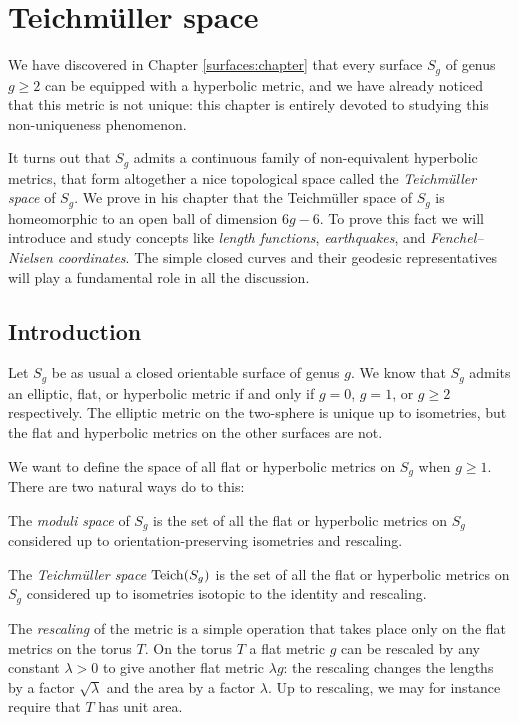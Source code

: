 \chapter{Teichm\"uller space} \label{Teichmuller:chapter}
We have discovered in Chapter \ref{surfaces:chapter} that every surface $S_g$ of genus $g\geqslant 2$ can be equipped with a hyperbolic metric, and we have already noticed that this metric is not unique: this chapter is entirely devoted to studying this non-uniqueness phenomenon.

It turns out that $S_g$ admits a continuous family of non-equivalent hyperbolic metrics, that form altogether a nice topological space called the \emph{Teichm\"uller space} of $S_g$. We prove in his chapter that the Teichm\"uller space of $S_g$ is homeomorphic to an open ball of dimension $6g-6$. To prove this fact we will introduce and study concepts like \emph{length functions}, \emph{earthquakes}, and \emph{Fenchel--Nielsen coordinates}. The simple closed curves and their geodesic representatives will play a fundamental role in all the discussion.

\section{Introduction}
Let $S_g$ be as usual a closed orientable surface of genus $g$. We know that $S_g$ admits an elliptic, flat, or hyperbolic metric if and only if $g=0$, $g=1$, or $g\geqslant 2$ respectively. The elliptic metric on the two-sphere is unique up to isometries, but the flat and hyperbolic metrics on the other surfaces are not.

We want to define the space of all flat or hyperbolic metrics on $S_g$ when $g\geqslant 1$. There are two natural ways do to this:

\begin{defn}
The \emph{moduli space} of $S_{g}$ is the set of all the flat or hyperbolic metrics on $S_{g}$ considered up to orientation-preserving isometries and rescaling.

The \emph{Teichm\"uller space} ${\rm Teich}(S_g)$ is the set of all the flat or hyperbolic metrics on $S_{g}$ considered up to isometries isotopic to the identity and rescaling.
\end{defn}

The \emph{rescaling} of the metric is a simple operation that takes place only on the flat metrics on the torus $T$. On the torus $T$ a flat metric $g$ can be rescaled by any constant $\lambda >0$ to give another flat metric $\lambda g$: the rescaling changes the lengths by a factor $\sqrt\lambda$ and the area by a factor $\lambda$. Up to rescaling, we may for instance require that $T$ has unit area.

